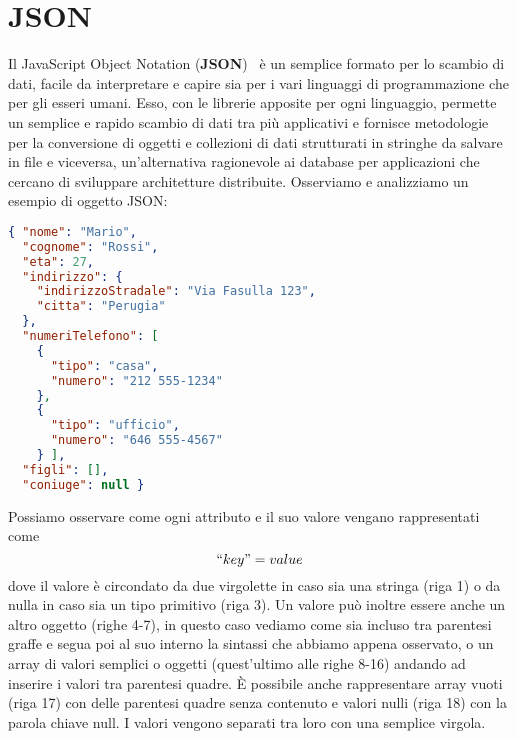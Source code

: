 \section{JSON}
\label{sub:json}
Il JavaScript Object Notation (\textbf{JSON})~\cite{json} è un semplice formato per lo scambio di dati,
facile da interpretare e capire sia per i vari linguaggi di programmazione che per gli esseri umani.
Esso, con le librerie apposite per ogni linguaggio, permette un semplice e rapido scambio
di dati tra più applicativi e fornisce metodologie per la conversione di oggetti e collezioni
di dati strutturati in stringhe da salvare in file e viceversa, un'alternativa ragionevole ai database
per applicazioni che cercano di sviluppare architetture distribuite.
Osserviamo e analizziamo un esempio di oggetto JSON:
\begin{lstlisting}[language=json,firstnumber=1]
{ "nome": "Mario",
  "cognome": "Rossi",
  "eta": 27,
  "indirizzo": {
    "indirizzoStradale": "Via Fasulla 123",
    "citta": "Perugia"
  },
  "numeriTelefono": [
    {
      "tipo": "casa",
      "numero": "212 555-1234"
    },
    {
      "tipo": "ufficio",
      "numero": "646 555-4567"
    } ],
  "figli": [],
  "coniuge": null }
\end{lstlisting} 
Possiamo osservare come ogni attributo e il suo valore vengano rappresentati come
\[``key" = value \]
dove il valore è circondato da due virgolette in caso sia una stringa (\textsf{riga 1})
o da nulla in caso sia un tipo primitivo (\textsf{riga 3}).
Un valore può inoltre essere anche un altro oggetto (\textsf{righe 4-7}), in questo caso
vediamo come sia incluso tra parentesi graffe e segua poi al suo interno la sintassi che
abbiamo appena osservato, o un array di valori semplici o oggetti (quest'ultimo alle \textsf{righe 8-16})
andando ad inserire i valori tra parentesi quadre.
È possibile anche rappresentare array vuoti (\textsf{riga 17}) con delle parentesi quadre senza
contenuto e valori nulli (\textsf{riga 18}) con la parola chiave \textsf{null}.
I valori vengono separati tra loro con una semplice virgola.